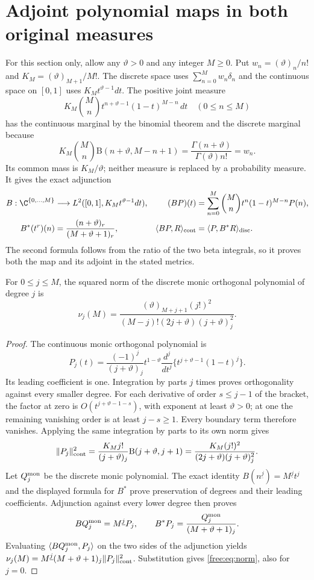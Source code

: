 \section{Adjoint polynomial maps in both original measures}
For this section only, allow any $\vartheta>0$ and any integer $M\ge0$.
Put $w_n=(\vartheta)_n/n!$ and $K_M=(\vartheta)_{M+1}/M!$.
The discrete space uses $\sum_{n=0}^Mw_n\delta_n$ and the continuous
space on $[0,1]$ uses $K_Mt^{\vartheta-1}dt$.
The positive joint measure
\[
 K_M\binom Mn t^{n+\vartheta-1}(1-t)^{M-n}\,dt
 \quad (0\le n\le M)
\]
has the continuous marginal by the binomial theorem and the discrete
marginal because
\[
 K_M\binom Mn\mathrm B(n+\vartheta,M-n+1)
 =\frac{\Gamma(n+\vartheta)}{\Gamma(\vartheta)n!}=w_n.
\]
Its common mass is $K_M/\vartheta$; neither measure is replaced by a
probability measure. It gives the exact adjunction
\begin{align*}
 B:\C^{\{0,\ldots,M\}}&\longrightarrow L^2([0,1],K_Mt^{\vartheta-1}dt),
 & (BP)(t)&=\sum_{n=0}^M\binom Mn t^n(1-t)^{M-n}P(n),\\
 B^*(t^r)(n)&=\frac{(n+\vartheta)_r}{(M+\vartheta+1)_r},
 &\langle BP,R\rangle_{\rm cont}&=\langle P,B^*R\rangle_{\rm disc}.
\end{align*}
The second formula follows from the ratio of the two beta integrals,
so it proves both the map and its adjoint in the stated metrics.

\begin{lemma}
For $0\le j\le M$, the squared norm of the discrete monic orthogonal
polynomial of degree $j$ is
\begin{equation}\label{free:eq:norm}
 \nu_j(M)=\frac{(\vartheta)_{M+j+1}(j!)^2}
 {(M-j)!(2j+\vartheta)(j+\vartheta)_j^2}.
\end{equation}
\end{lemma}
\begin{proof}
The continuous monic orthogonal polynomial is
\[
 P_j(t)=\frac{(-1)^j}{(j+\vartheta)_j}
 t^{1-\vartheta}\frac{d^j}{dt^j}
       \{t^{j+\vartheta-1}(1-t)^j\}.
\]
Its leading coefficient is one. Integration by parts $j$ times proves
orthogonality against every smaller degree. For each derivative of
order $s\le j-1$ of the bracket, the factor at zero is
$O(t^{j+\vartheta-1-s})$, with exponent at least $\vartheta>0$;
at one the remaining vanishing order is at least $j-s\ge1$.
Every boundary term therefore vanishes. Applying the same integration
by parts to its own norm gives
\[
 \|P_j\|_{\rm cont}^2
 =\frac{K_Mj!}{(j+\vartheta)_j}
       \mathrm B(j+\vartheta,j+1)
 =\frac{K_M(j!)^2}{(2j+\vartheta)(j+\vartheta)_j^2}.
\]
Let $Q_j^{\rm mon}$ be the discrete monic polynomial. The exact identity
$B(n^{\underline j})=M^{\underline j}t^j$ and the displayed formula
for $B^*$ prove preservation of degrees and their leading coefficients.
Adjunction against every lower degree then proves
\[
 BQ_j^{\rm mon}=M^{\underline j}P_j,\qquad
 B^*P_j=\frac{Q_j^{\rm mon}}{(M+\vartheta+1)_j}.
\]
Evaluating $\langle BQ_j^{\rm mon},P_j\rangle$ on the two sides of the
adjunction yields
$\nu_j(M)=M^{\underline j}(M+\vartheta+1)_j\|P_j\|_{\rm cont}^2$.
Substitution gives \eqref{free:eq:norm}, also for $j=0$.
\end{proof}

